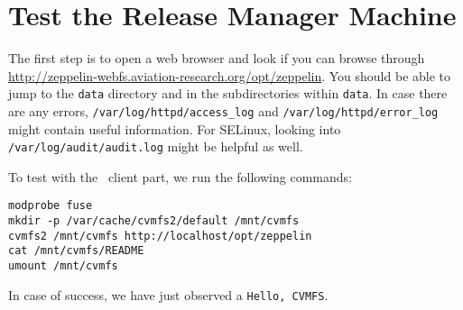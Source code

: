 \section{Test the Release Manager Machine}
The first step is to open a web browser and look if you can browse through \url{http://zeppelin-webfs.aviation-research.org/opt/zeppelin}.
You should be able to jump to the \texttt{data} directory and in the subdirectories within \texttt{data}.
In case there are any errors, \texttt{/var/log/httpd/access\_log} and \texttt{/var/log/httpd/error\_log} might contain useful information.
For SELinux, looking into \texttt{/var/log/audit/audit.log} might be helpful as well.

To test with the \cvmfs\ client part, we run the following commands:
\begin{lstlisting}
modprobe fuse
mkdir -p /var/cache/cvmfs2/default /mnt/cvmfs
cvmfs2 /mnt/cvmfs http://localhost/opt/zeppelin
cat /mnt/cvmfs/README
umount /mnt/cvmfs
\end{lstlisting}
In case of success, we have just observed a \texttt{Hello, CVMFS}.